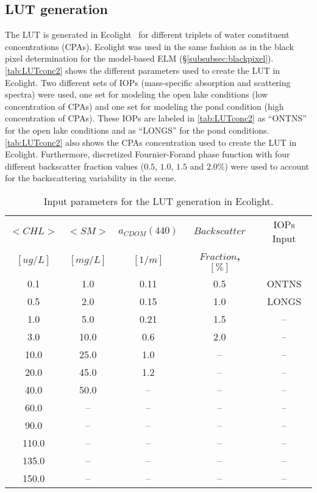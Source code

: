 \subsection{LUT generation}
The LUT is generated in Ecolight~\cite{MobleyHE} for different triplets of water constituent concentrations (CPAs). Ecolight was used in the same fashion as in the black pixel determination for the model-based ELM (\S\ref{subsubsec:blackpixel}). \autoref{tab:LUTconc2} shows the different parameters used to create the LUT in Ecolight. Two different sets of IOPs (mass-specific absorption and scattering spectra) were used, one set for modeling the open lake conditions (low concentration of CPAs) and one set for modeling the pond condition (high concentration of CPAs). These IOPs are labeled in \autoref{tab:LUTconc2} as ``ONTNS'' for the open lake conditions and as ``LONGS'' for the pond conditions. \autoref{tab:LUTconc2} also shows the CPAs concentration used to create the LUT in Ecolight. Furthermore, discretized Fournier-Forand phase function with four different backscatter fraction values ($0.5$, $1.0$, $1.5$ and $2.0\%$) were used to account for the backscattering variability in the scene.


\begin{table}[!ht]
\caption{ Input parameters for the LUT generation in Ecolight. \label{tab:LUTconc2} } 
\centering
		\begin{tabular}{c|c|c|c|c}
        		\bfseries{$<CHL>$}  	& \bfseries{$<SM>$}  & \bfseries{$a_{CDOM}(440)$} & \bfseries{$Backscatter$} & IOPs Input\\
		$[ug/L]$  		& $[mg/L]$ & 	$[1/m]$ &	\bfseries{$Fraction$}, $[\%]$	\\ \hline \hline
0.1   & 1.0  &  0.11 &  0.5 & ONTNS\\
0.5   & 2.0  &  0.15 &  1.0 & LONGS\\
1.0   & 5.0  &  0.21 &  1.5 & --\\
3.0   & 10.0 &  0.6  &  2.0 & --\\
10.0  & 25.0 &  1.0  &  --  & --\\
20.0  & 45.0 &  1.2  &  --  & --\\
40.0  & 50.0 &  --   &  --  & --\\
60.0  & --   &  --   &  --  & --\\  
90.0  & --   &  --   &  --  & --\\  
110.0 & --   &  --   &  --  & --\\  
135.0 & --   &  --   &  --  & --\\  
150.0 & --   &  --   &  --  & --\\     
	 	\end{tabular}
	\end{table}


